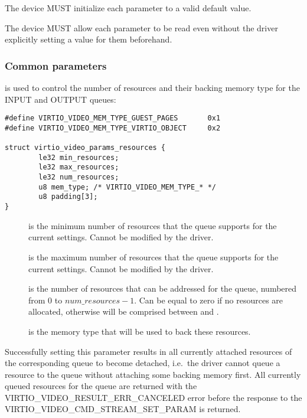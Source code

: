 
The device MUST initialize each parameter to a valid default value.

The device MUST allow each parameter to be read even without the driver
explicitly setting a value for them beforehand.

\subsubsection{Common parameters}\label{sec:Device Types / Video Device / Parameters / Common parameters}

 is used to control the
number of resources and their backing memory type for the INPUT and
OUTPUT queues:

\begin{lstlisting}
#define VIRTIO_VIDEO_MEM_TYPE_GUEST_PAGES       0x1
#define VIRTIO_VIDEO_MEM_TYPE_VIRTIO_OBJECT     0x2

struct virtio_video_params_resources {
        le32 min_resources;
        le32 max_resources;
        le32 num_resources;
        u8 mem_type; /* VIRTIO_VIDEO_MEM_TYPE_* */
        u8 padding[3];
}
\end{lstlisting}

\begin{description}
\item[]
is the minimum number of resources that the queue supports for the
current settings. Cannot be modified by the driver.
\item[]
is the maximum number of resources that the queue supports for the
current settings. Cannot be modified by the driver.
\item[]
is the number of resources that can be addressed for the queue, numbered
from \(0\) to \(num\_resources - 1\). Can be equal to zero if no
resources are allocated, otherwise will be comprised between
 and .
\item[]
is the memory type that will be used to back these resources.
\end{description}

Successfully setting this parameter results in all currently attached
resources of the corresponding queue to become detached, i.e.~the driver
cannot queue a resource to the queue without attaching some backing
memory first. All currently queued resources for the queue are returned
with the VIRTIO_VIDEO_RESULT_ERR_CANCELED error before the response
to the VIRTIO_VIDEO_CMD_STREAM_SET_PARAM is returned.

